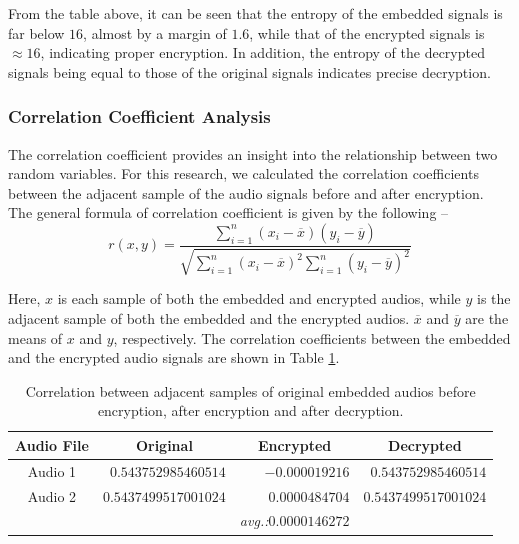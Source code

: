 \documentclass[a4paper]{cas-sc}
\begin{document}
From the table above, it can be seen that the entropy of the embedded signals is far below $16$, almost by a margin of $1.6$, while that of the encrypted signals is $\approx16$, indicating proper encryption. In addition, the entropy of the decrypted signals being equal
to those of the original signals indicates precise decryption.
\subsubsection{Correlation Coefficient Analysis}
The correlation coefficient provides an insight into the relationship between two random variables. For this research, we calculated the correlation coefficients between the adjacent sample of the audio signals before and after encryption. The general formula of correlation coefficient is given by the following --
\begin{equation}
    r(x,y)=\frac{\sum_{i=1}^{n}(x_i-\overline{x})(y_i-\overline{y})}{\sqrt{\sum_{i=1}^{n}(x_i-\overline{x})^2\sum_{i=1}^{n}(y_i-\overline{y})^2}}
\end{equation}

Here, $x$ is each sample of both the embedded and encrypted audios, while $y$ is the adjacent sample of both the embedded and the encrypted audios. $\overline{x}$ and $\overline{y}$ are the means of $x$ and $y$, respectively. The correlation coefficients between the embedded and the encrypted audio signals are shown in Table \ref{table:corrcoef}.
\begin{table}[pos=h]
    \begin{center}
        \caption{Correlation between adjacent samples of original embedded audios before encryption, after encryption and after decryption.}
        \begin{tabular}{crrr}
            \hline
            \multicolumn{1}{c|}{Audio File} & \multicolumn{1}{c}{Original} & \multicolumn{1}{c}{Encrypted}         & \multicolumn{1}{c}{Decrypted} \\ \hline
            \multicolumn{1}{c|}{Audio 1}    & $0.543752985460514$          & $-0.000019216$                        & $0.543752985460514$           \\
            \multicolumn{1}{c|}{Audio 2}    & $0.5437499517001024$         & $0.0000484704$                        & $0.5437499517001024$          \\ \hline
                                            &                              & \textit{avg.:}$\mathbf{0.0000146272}$ &                               \\
        \end{tabular}
        \label{table:corrcoef}
    \end{center}
\end{table}
\end{document}
